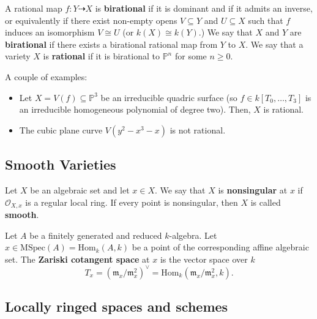 \documentclass{template}
\begin{document}
\begin{definition}
    A rational map $f: Y \dashrightarrow X$ is \textbf{birational} if it is dominant
    and if it admits an inverse, or equivalently if there exist non-empty opens
    $V \subseteq Y$ and $U \subseteq X$ such that $f$ induces an isomorphism
    $V \cong U$ (or $k(X) \cong k(Y)$.) We say that $X$ and $Y$ are \textbf{birational}
    if there exists a birational rational map from $Y$ to $X$. We say that 
    a variety $X$ is \textbf{rational} if it is birational to $\mathbb{P}^n$ for 
    some $n \geq 0$.
\end{definition}

\begin{example}
    A couple of examples:
    \begin{itemize}
        \item Let $X=V(f) \subseteq \mathbb{P}^3$ be an irreducible quadric
    surface (so $f \in k[T_0,\dots,T_3]$ is an irreducible homogeneous
    polynomial of degree two). Then, $X$ is rational.
        \item The cubic plane curve $V(y^2-x^3-x)$ is not rational.
    \end{itemize}
\end{example}

\subsection{Smooth Varieties}

\begin{definition}
    Let $X$ be an algebraic set and let $x \in X$. We say that $X$ is
    \textbf{nonsingular} at $x$ if $\mathcal{O}_{X,x}$ is a regular local ring.
    If every point is nonsingular, then $X$ is called \textbf{smooth}.
\end{definition}

\begin{definition}
    Let $A$ be a finitely generated and reduced $k$-algebra. Let $x \in \text{MSpec}(A) = \text{Hom}_k(A,k)$
    be a point of the corresponding affine algebraic set. The \textbf{Zariski cotangent space} at $x$ is the vector space over $k$
    \begin{equation*}
        T_x = (\mathfrak{m}_x / \mathfrak{m}_x^2)^{\vee} = \text{Hom}_k(\mathfrak{m}_x/\mathfrak{m}_x^2, k).
    \end{equation*}
\end{definition}

\subsection{Locally ringed spaces and schemes}
\end{document}
